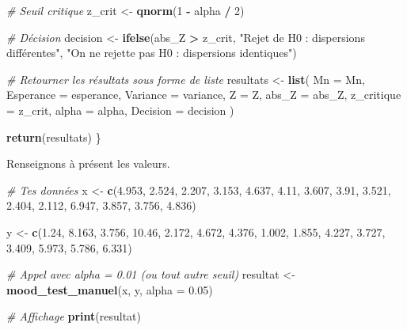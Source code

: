 \documentclass[
  12pt,
]{article}
\newenvironment{Shaded}{\begin{snugshade}}{\end{snugshade}}
\newcommand{\AttributeTok}[1]{\textcolor[rgb]{0.13,0.29,0.53}{#1}}
\newcommand{\CommentTok}[1]{\textcolor[rgb]{0.56,0.35,0.01}{\textit{#1}}}
\newcommand{\DecValTok}[1]{\textcolor[rgb]{0.00,0.00,0.81}{#1}}
\newcommand{\FloatTok}[1]{\textcolor[rgb]{0.00,0.00,0.81}{#1}}
\newcommand{\FunctionTok}[1]{\textcolor[rgb]{0.13,0.29,0.53}{\textbf{#1}}}
\newcommand{\NormalTok}[1]{#1}
\newcommand{\OtherTok}[1]{\textcolor[rgb]{0.56,0.35,0.01}{#1}}
\newcommand{\SpecialCharTok}[1]{\textcolor[rgb]{0.81,0.36,0.00}{\textbf{#1}}}
\newcommand{\StringTok}[1]{\textcolor[rgb]{0.31,0.60,0.02}{#1}}
\begin{document}
\begin{Shaded}
\begin{Highlighting}[]
  \CommentTok{\# Seuil critique}
\NormalTok{  z\_crit }\OtherTok{\textless{}{-}} \FunctionTok{qnorm}\NormalTok{(}\DecValTok{1} \SpecialCharTok{{-}}\NormalTok{ alpha }\SpecialCharTok{/} \DecValTok{2}\NormalTok{)}
  
  \CommentTok{\# Décision}
\NormalTok{  decision }\OtherTok{\textless{}{-}} \FunctionTok{ifelse}\NormalTok{(abs\_Z }\SpecialCharTok{\textgreater{}}\NormalTok{ z\_crit,}
                     \StringTok{"Rejet de H0 : dispersions différentes"}\NormalTok{,}
                     \StringTok{"On ne rejette pas H0 : dispersions identiques"}\NormalTok{)}
  
  \CommentTok{\# Retourner les résultats sous forme de liste}
\NormalTok{  resultats }\OtherTok{\textless{}{-}} \FunctionTok{list}\NormalTok{(}
    \AttributeTok{Mn =}\NormalTok{ Mn,}
    \AttributeTok{Esperance =}\NormalTok{ esperance,}
    \AttributeTok{Variance =}\NormalTok{ variance,}
    \AttributeTok{Z =}\NormalTok{ Z,}
    \AttributeTok{abs\_Z =}\NormalTok{ abs\_Z,}
    \AttributeTok{z\_critique =}\NormalTok{ z\_crit,}
    \AttributeTok{alpha =}\NormalTok{ alpha,}
    \AttributeTok{Decision =}\NormalTok{ decision}
\NormalTok{  )}
  
  \FunctionTok{return}\NormalTok{(resultats)}
\NormalTok{\}}
\end{Highlighting}
\end{Shaded}

Renseignons à présent les valeurs.

\begin{Shaded}
\begin{Highlighting}[]
\CommentTok{\# Tes données}
\NormalTok{x }\OtherTok{\textless{}{-}} \FunctionTok{c}\NormalTok{(}\FloatTok{4.953}\NormalTok{, }\FloatTok{2.524}\NormalTok{, }\FloatTok{2.207}\NormalTok{, }\FloatTok{3.153}\NormalTok{, }\FloatTok{4.637}\NormalTok{, }\FloatTok{4.11}\NormalTok{, }\FloatTok{3.607}\NormalTok{, }\FloatTok{3.91}\NormalTok{, }\FloatTok{3.521}\NormalTok{,}
       \FloatTok{2.404}\NormalTok{, }\FloatTok{2.112}\NormalTok{, }\FloatTok{6.947}\NormalTok{, }\FloatTok{3.857}\NormalTok{, }\FloatTok{3.756}\NormalTok{, }\FloatTok{4.836}\NormalTok{)}

\NormalTok{y }\OtherTok{\textless{}{-}} \FunctionTok{c}\NormalTok{(}\FloatTok{1.24}\NormalTok{, }\FloatTok{8.163}\NormalTok{, }\FloatTok{3.756}\NormalTok{, }\FloatTok{10.46}\NormalTok{, }\FloatTok{2.172}\NormalTok{, }\FloatTok{4.672}\NormalTok{, }\FloatTok{4.376}\NormalTok{, }\FloatTok{1.002}\NormalTok{, }\FloatTok{1.855}\NormalTok{,}
       \FloatTok{4.227}\NormalTok{, }\FloatTok{3.727}\NormalTok{, }\FloatTok{3.409}\NormalTok{, }\FloatTok{5.973}\NormalTok{, }\FloatTok{5.786}\NormalTok{, }\FloatTok{6.331}\NormalTok{)}

\CommentTok{\# Appel avec alpha = 0.01 (ou tout autre seuil)}
\NormalTok{resultat }\OtherTok{\textless{}{-}} \FunctionTok{mood\_test\_manuel}\NormalTok{(x, y, }\AttributeTok{alpha =} \FloatTok{0.05}\NormalTok{)}

\CommentTok{\# Affichage}
\FunctionTok{print}\NormalTok{(resultat)}
\end{Highlighting}
\end{Shaded}
\end{document}
